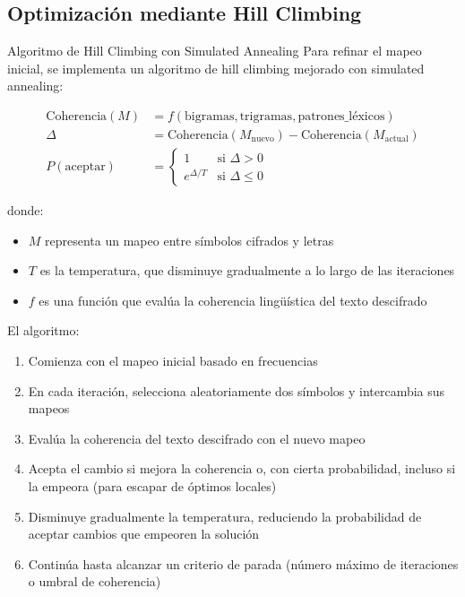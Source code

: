 \subsection{Optimización mediante Hill Climbing}

\begin{cryptomethod}{Algoritmo de Hill Climbing con Simulated Annealing}
Para refinar el mapeo inicial, se implementa un algoritmo de hill climbing mejorado con simulated annealing:

\begin{align}
\text{Coherencia}(M) &= f(\text{bigramas}, \text{trigramas}, \text{patrones\_léxicos}) \\
\Delta &= \text{Coherencia}(M_{\text{nuevo}}) - \text{Coherencia}(M_{\text{actual}}) \\
P(\text{aceptar}) &= 
\begin{cases}
1 & \text{si } \Delta > 0 \\
e^{\Delta/T} & \text{si } \Delta \leq 0
\end{cases}
\end{align}

donde:
\begin{itemize}
    \item $M$ representa un mapeo entre símbolos cifrados y letras
    \item $T$ es la temperatura, que disminuye gradualmente a lo largo de las iteraciones
    \item $f$ es una función que evalúa la coherencia lingüística del texto descifrado
\end{itemize}

El algoritmo:
\begin{enumerate}
    \item Comienza con el mapeo inicial basado en frecuencias
    \item En cada iteración, selecciona aleatoriamente dos símbolos y intercambia sus mapeos
    \item Evalúa la coherencia del texto descifrado con el nuevo mapeo
    \item Acepta el cambio si mejora la coherencia o, con cierta probabilidad, incluso si la empeora (para escapar de óptimos locales)
    \item Disminuye gradualmente la temperatura, reduciendo la probabilidad de aceptar cambios que empeoren la solución
    \item Continúa hasta alcanzar un criterio de parada (número máximo de iteraciones o umbral de coherencia)
\end{enumerate}
\end{cryptomethod}

